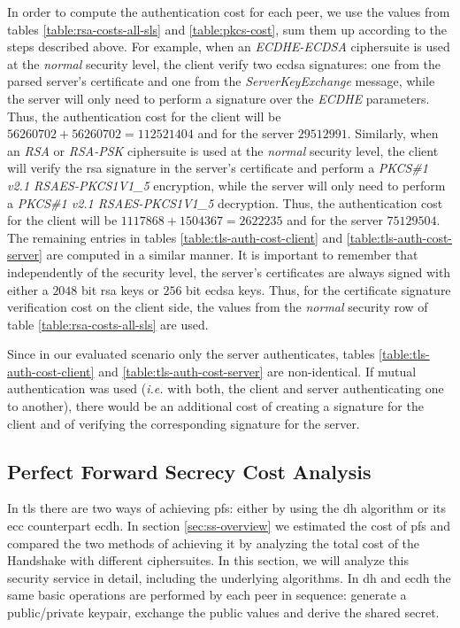 \documentclass{llncs}
\begin{document}
In order to compute the authentication cost for each peer, we use the values from tables \ref{table:rsa-costs-all-sls} and \ref{table:pkcs-cost},
sum them up according to the steps described above. For example, when an \textit{ECDHE-ECDSA} ciphersuite is used at the \textit{normal} security level,
the client verify two \gls{ecdsa} signatures: one from the parsed server's certificate
and one from the \textit{ServerKeyExchange} message, while the server will only need to perform a signature over the \textit{ECDHE} parameters.
Thus, the authentication cost for the client will be $56260702+56260702=112521404$ and for the server $29512991$. Similarly, when an \textit{RSA} or
\textit{RSA-PSK} ciphersuite is used at the \textit{normal} security level, the client will verify the \gls{rsa} signature in the server's certificate
and perform a \textit{PKCS\#1 v2.1 RSAES-PKCS1\-V1\_5} encryption, while the server will only need to perform a
\textit{PKCS\#1 v2.1 RSAES-PKCS1\-V1\_5} decryption. Thus, the authentication cost for the client will be $1117868+1504367=2622235$ and for the server
$75129504$. The remaining entries in tables \ref{table:tls-auth-cost-client} and \ref{table:tls-auth-cost-server} are computed in a similar manner.
It is important to remember that independently of the security level, the server's certificates are always signed with either a $2048$ bit \gls{rsa}
keys or $256$ bit \gls{ecdsa} keys. Thus, for the certificate signature verification cost on the client side, the values from the \textit{normal}
security row of table \ref{table:rsa-costs-all-sls} are used.

Since in our evaluated scenario only the server authenticates, tables \ref{table:tls-auth-cost-client} and \ref{table:tls-auth-cost-server}
are non-identical. If mutual authentication was used (\textit{i.e.} with both, the client and server authenticating one to another), there would be
an additional cost of creating a signature for the client and of verifying the corresponding signature for the server.

\subsection{Perfect Forward Secrecy Cost Analysis} \label{sec:pfs-costs}

In \gls{tls} there are two ways of achieving \gls{pfs}: either by using the \gls{dh} algorithm or its \gls{ecc} counterpart \gls{ecdh}.
In section \ref{sec:ss-overview} we estimated the cost of \gls{pfs} and compared the two methods of achieving it by analyzing the total cost of the
Handshake with different ciphersuites. In this section, we will analyze this security service in detail, including the underlying algorithms.
In \gls{dh} and \gls{ecdh} the same basic operations are performed by each peer in sequence: generate a public/private keypair, exchange the public values
and derive the shared secret.
\end{document}
